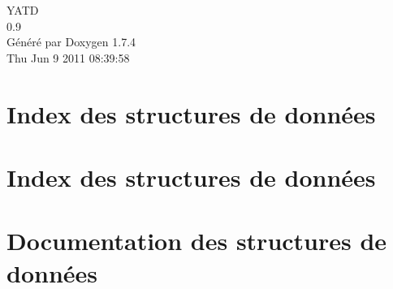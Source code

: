 \documentclass[a4paper]{book}
\begin{document}
\hypersetup{pageanchor=false}
\begin{titlepage}
\vspace*{7cm}
\begin{center}
{\Large YATD \\[1ex]\large 0.9 }\\
\vspace*{1cm}
{\large Généré par Doxygen 1.7.4}\\
\vspace*{0.5cm}
{\small Thu Jun 9 2011 08:39:58}\\
\end{center}
\end{titlepage}
\clearemptydoublepage
{}
\tableofcontents
\clearemptydoublepage
{}
\hypersetup{pageanchor=true}
\chapter{Index des structures de données}

\chapter{Index des structures de données}

\chapter{Documentation des structures de données}













\printindex
\end{document}
